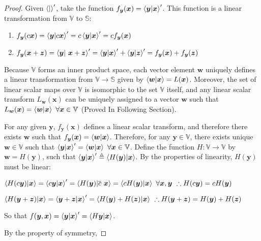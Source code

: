 \documentclass{article}
\newcommand{\B}[1]{\boldsymbol{#1}}
\theoremstyle{definition}
\theoremstyle{remark}
\begin{document}
\begin{proof}
  Given $\braket{|}^\prime$, take the function $f_{\B{y}}(\B{x}) = \braket{\B{y} | \B{x}}^\prime$.
  This function is a linear transformation from $\mathbb{V}$ to $\mathbb{S}$: 
  \begin{enumerate}
    \item  $f_{\B{y}}(c\B{x})= \braket{\B{y} | c\B{x}}^\prime = c \braket{\B{y} | \B{x}}^\prime = cf_{\B{y}}(\B{x})$
    \item $f_{\B{y}}(\B{x} + \B{z})  = \braket{\B{y}| ~ \B{x} + \B{z}}^\prime = \braket{\B{y}| \B{x}}^\prime + \braket{\B{y}| \B{z}}^\prime =  f_{\B{y}}(\B{x}) + f_{\B{y}}(\B{z}) $
  \end{enumerate}

  Because $\mathbb{V}$ forms an inner product space, each vector element $\B{w}$ uniquely defines a linear transformation
  from $\mathbb{V} \to \mathbb{S}$ given by $\braket{\B{w} | \B{x}} = L(\B{x})$. Moreover, the set of 
  linear scalar maps over $\mathbb{V}$ is isomorphic to the set $\mathbb{V}$ itself, and any linear 
  scalar transform $L_{\B{w}}(\B{x})$ can be uniquely assigned to a vector $\B{w}$ such that $L_{\B{w}}(\B{x}) = \braket{\B{w}|\B{x}} ~\forall \B{x} \in \mathbb{V}$
  (Proved In Following Section).

  For any given $\B{y}$, $f_{\B{y}}(\B{x})$ defines a linear scalar transform, and therefore there exists $\B{w}$ such that
  $f_{\B{y}}(\B{x}) = \braket{\B{w} | \B{x}}$. Therefore, for any $\B{y} \in \mathbb{V}$, there exists unique $\B{w} \in \mathbb{V}$ such that
  $\braket{\B{y}|\B{x}}^\prime = \braket{\B{w} | \B{x}} ~ \forall \B{x} \in \mathbb{V}$. Define the function $H : \mathbb{V} \to \mathbb{V}$ by
  $\B{w} = H(\B{y})$, such that $\braket{\B{y}|\B{x}}^\prime \triangleq \braket{H(\B{y}) | \B{x}}$.
  By the properties of linearity, $H(\B{y})$ must be linear:

    $\braket{H(c\B{y}) | \B{x}}  =   \braket{c \B{y} |\B{x}}^\prime =  \braket{H(\B{y}) |\overline{c} ~ \B{x}} =  \braket{c H(\B{y}) | \B{x}} ~ \forall \B{x}, \B{y} ~ \therefore H(c\B{y}) = c H(\B{y})$

   $\braket{H(\B{y} + \B{z}) | \B{x}} = \braket{\B{y} + \B{z} |\B{x}}^\prime =  \braket{H(\B{y}) + H(\B{z}) | \B{x}} ~ \therefore H(\B{y} + \B{z}) = H(\B{y}) + H(\B{z})$

  So that $f(\B{y},\B{x}) = \braket{\B{y} | \B{x}}^\prime = \braket{H \B{y} |\B{x}}$.
  
  By the property of symmetry, 


\end{proof}
\end{document}
